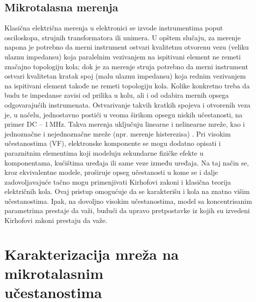 \documentclass[a4paper, 12pt, diplomski]{etf}
\begin{document}
\subsection{Mikrotalasna merenja}
Klasična električna merenja u elektronici se izvode 
instrumentima poput osciloskopa, strujnih transformatora ili unimera. U opštem slučaju, za merenje napona je potrebno da merni instrument ostvari kvalitetnu otvorenu vezu (veliku ulaznu impedansu) koja paralelnim vezivanjem na ispitivani element
ne remeti značajno topologiju kola; dok je za merenje struja potrebno da merni instrument ostvari
kvalitetan kratak spoj (malu ulaznu impedansu) koja rednim vezivanjem na ispitivani element takođe ne
remeti topologiju kola. Kolike konkretno treba da budu te impedanse zavisi od prilika u kolu, 
ali i od odabira mernih opsega odgovarajućih instrumenata.
Ostvarivanje takvih kratkih spojeva i otvorenih veza je, u načelu, jednostavno postići
u veoma širikom opsegu niskih učestanosti, na primer
DC -- 1\,MHz. Takva merenja uključuju linearne i nelinearne mreže, kao i jednoznačne i 
nejednoznačne mreže (npr. merenje histerezisa) \cite{Peja1}. Pri visokim učestanostima (VF), elektronske komponente se mogu dodatno opisati i paraznitnim elementima koji modeluju sekundarne fizičke efekte
u komponentama, kućištima uređaja ili same veze između uređaja. 
Na taj način se, kroz ekvivalentne modele, proširuje opseg učestanosti u kome se i dalje zadovoljavajuće tačno mogu primenjivati 
Kirhofovi
zakoni i klasična teorija električnih kola.
Ovaj pristup omogućuje da se
karakterišu i kola na znatno višim učestanostima.
Ipak, na dovoljno visokim učestanostima, model sa
koncentrisanim parametrima prestaje da važi, budući da upravo pretpostavke iz kojih su izvedeni Kirhofovi zakoni prestaju da važe.
\cite{mwmeas}

\section[Karakterizacija mreža na mikrotalasnim  učestanostima]{Karakterizacija mreža na mikrotalasnim \\ učestanostima}
\end{document}
